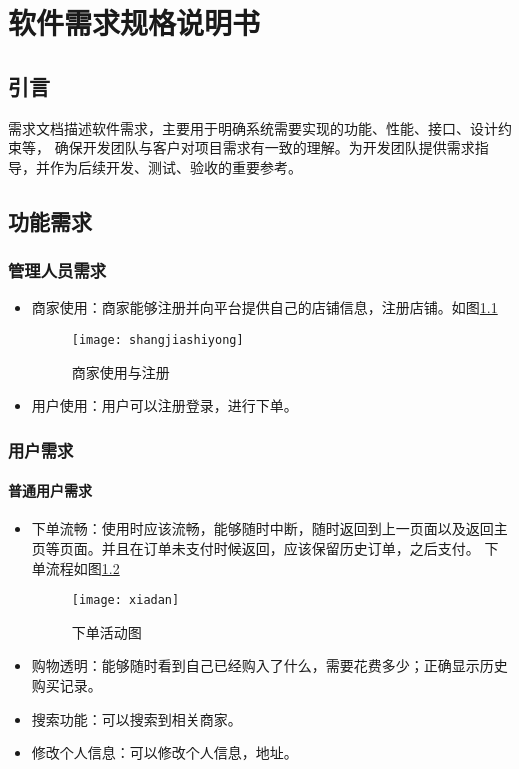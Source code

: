 \chapter{软件需求规格说明书}
\section{引言}
需求文档描述软件需求，主要用于明确系统需要实现的功能、性能、接口、设计约束等，
确保开发团队与客户对项目需求有一致的理解。为开发团队提供需求指导，并作为后续开发、测试、验收的重要参考。
\section{功能需求}

\subsection{管理人员需求}
\begin{itemize}
    \item{商家使用}：商家能够注册并向平台提供自己的店铺信息，注册店铺。如图\ref{fig:dd}
    \begin{figure}[htbp]
        \centering
        \texttt{[image: shangjiashiyong]}
        \caption{商家使用与注册}\label{fig:dd}
    \end{figure}
    \item{用户使用}：用户可以注册登录，进行下单。
\end{itemize}


\subsection{用户需求}
\subsubsection{普通用户需求}
\begin{itemize}
    \item{下单流畅}：使用时应该流畅，能够随时中断，随时返回到上一页面以及返回主页等页面。并且在订单未支付时候返回，应该保留历史订单，之后支付。
    下单流程如图\ref{fig:ds}
    \begin{figure}[htbp]
        \centering
        \texttt{[image: xiadan]}
        \caption{下单活动图}\label{fig:ds}
    \end{figure}
    \item{购物透明}：能够随时看到自己已经购入了什么，需要花费多少；正确显示历史购买记录。
    \item {搜索功能}：可以搜索到相关商家。
    \item {修改个人信息}：可以修改个人信息，地址。
\end{itemize}

